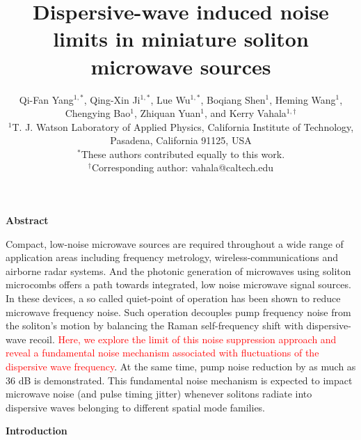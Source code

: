 \documentclass[noshowpacs,amsmath,
twocolumn,
superscriptaddress,
8pt,
aps,prb]{revtex4-2}
\begin{document}
\title{Dispersive-wave induced noise limits in miniature soliton microwave sources}

\author{Qi-Fan Yang$^{1,\ast}$, Qing-Xin Ji$^{1,\ast}$, Lue Wu$^{1,\ast}$, Boqiang Shen$^{1}$, Heming Wang$^{1}$, Chengying Bao$^{1}$, Zhiquan Yuan$^{1}$, and Kerry Vahala$^{1,\dagger}$\\
$^1$T. J. Watson Laboratory of Applied Physics, California Institute of Technology, Pasadena, California 91125, USA\\
$^{\ast}$These authors contributed equally to this work.\\
$^{\dagger}$Corresponding author: vahala@caltech.edu}


\maketitle

\noindent\textbf{Abstract}

\noindent Compact, low-noise microwave sources are required throughout a wide range of application areas including frequency metrology, wireless-communications and airborne radar systems. And the photonic generation of microwaves using soliton microcombs offers a path towards integrated, low noise microwave signal sources.  In these devices, a so called quiet-point of operation has been shown to reduce microwave frequency noise.  Such operation decouples pump frequency noise from the soliton's motion by balancing the Raman self-frequency shift with dispersive-wave recoil. \textcolor{red}{Here, we explore the limit of this noise suppression approach and reveal a fundamental noise mechanism associated with fluctuations of the dispersive wave frequency}. At the same time, pump noise reduction by as much as 36 dB is demonstrated. This fundamental noise mechanism is expected to impact microwave noise (and pulse timing jitter) whenever solitons radiate into dispersive waves belonging to different spatial mode families.

\noindent\textbf{Introduction}
\end{document}
